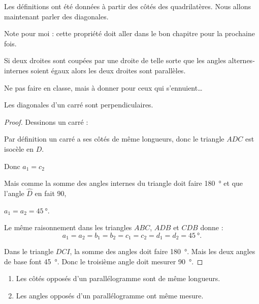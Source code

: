 Les définitions ont été données à partir des côtés des quadrilatères. Nous allons maintenant parler des diagonales.

Note pour moi : cette propriété doit aller dans le bon chapitre pour la prochaine fois.
\begin{propriete}
    Si deux droites sont coupées par une droite de telle sorte que les angles alternes-internes soient égaux alors les deux droites sont parallèles.
\end{propriete}

\begin{center}

\end{center}


Ne pas faire en classe, mais à donner pour ceux qui s'ennuient\ldots
\begin{propriete}
    Les diagonales d'un carré sont perpendiculaires.
\end{propriete}

\begin{proof}
    Dessinons un carré :
    \begin{center}
        
    \end{center}
    Par définition un carré a ses côtés de même longueurs, donc le triangle \( ADC\) est isocèle en \( D\).
    \begin{center}
        Donc \( a_1=c_2\)
    \end{center}
    Mais comme la somme des angles internes du triangle doit faire \SI{180}{\degree} et que l'angle \( \hat D\) en fait \( 90\), 
    \begin{center}
        \( a_1=a_2=\SI{45}{\degree}\).
    \end{center}
    Le même raisonnement dans les triangles \( ABC\), \( ADB\) et \( CDB\) donne :
    \begin{equation}
        a_1=a_2=b_1=b_2=c_1=c_2=d_1=d_2=\SI{45}{\degree}.
    \end{equation}
    
    Dans le triangle \( DCI\), la somme des angles doit faire \SI{180}{\degree}. Mais les deux angles de base font \SI{45}{\degree}. Donc le troisième angle doit mesurer \SI{90}{\degree}.

\end{proof}

\begin{propriete}
    \begin{enumerate}
        \item
            Les côtés opposés d'un parallélogramme sont de même longueurs.
        \item
            Les angles opposés d'un parallélogramme ont même mesure.
    \end{enumerate}
\end{propriete}

